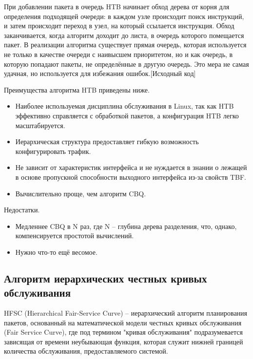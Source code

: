         При добавлении пакета в очередь HTB начинает обход дерева от корня
        для определения подходящей очереди: в каждом узле происходит поиск
        инструкций, и затем происходит переход в узел, на который ссылается
        инструкция. Обход заканчивается, когда алгоритм доходит до листа,
        в очередь которого помещается пакет.\cite{tchtb} В реализации алгоритма
		существует прямая очередь, которая используется не только в качестве
		очереди с наивысшем приоритетом, но и как очередь, в которую попадают
		пакеты, не определённые в другую очередь. Это мера не самая удачная,
		но используется для избежания ошибок.[Исходный код]

        Преимущества алгоритма HTB приведены ниже.
        \begin{itemize}
            \item Наиболее используемая дисциплина обслуживания в Linux, так как HTB эффективно
				  справляется с обработкой пакетов, а конфигурация HTB легко масштабируется.\cite{lartc}
            \item Иерархическая структура предоставляет гибкую возможность конфигурировать трафик.
            \item Не зависит от характеристик интерфейса и не нуждается в знании о лежащей в
                  основе пропускной способности выходного интерфейса из-за свойств TBF. \cite{tchtb}
            \item Вычислительно проще, чем алгоритм CBQ.\cite{htb}
        \end{itemize}

        Недостатки.
        \begin{itemize}
            \item Медленнее CBQ в N раз, где N -- глубина дерева разделения, что, однако, компенсируется простотой вычислений.\cite{htb}
			\item Нужно что-то ещё весомое.
        \end{itemize}

    \subsection{Алгоритм иерархических честных кривых обслуживания}

        HFSC (Hierarchical Fair-Service Curve) -- иерархический алгоритм планирования пакетов,
        основанный на математической модели честных кривых обслуживания (Fair Service Curve),
        где под термином "кривая обслуживания" подразумевается зависящая от времени
        неубывающая функция, которая служит нижней границей количества обслуживания,
        предоставляемого системой.\cite{hfsc}

